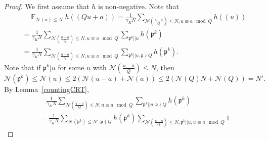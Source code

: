 \documentclass[11pt]{amsart}
\theoremstyle{definition}
\DeclareMathOperator*{\E}{\mathbb{E}}
\newcommand{\NN}{{\mathcal N}}
\newcommand{\mf}{\mathfrak}
\begin{document}
\begin{proof}
We first assume that $h$ is non-negative.
 Note that
\begin{equation}\label{firstTK}
    \begin{split}
        &\quad \E_{\NN(u) \leq N}h((Qu+a))
        =\frac{1}{\gamma_{K} N}\sum_{\NN(\frac{u-a}{Q})\leq N, u\equiv a \mod Q}h((u))
        \\&=\frac{1}{\gamma_{K} N}\sum_{\NN(\frac{u-a}{Q})\leq N, u\equiv a \mod Q}\sum_{\mf p^{k}|| u} h(\mf p^{k})
        \\&=\frac{1}{\gamma_{K} N}\sum_{\NN(\frac{u-a}{Q})\leq N, u\equiv a \mod Q}\sum_{\mf p^{k}|| u, \mf p\nmid Q} h(\mf p^{k}).
    \end{split}
\end{equation}
%
 Note that if $\mf p^{k}\vert u$ for some $u$ with $\NN(\frac{u-a}{Q})\leq N$, then
$$\NN(\mf p^{k})\leq \NN(u)\leq 2(\NN(u-a)+\NN(a))\leq 2(\NN(Q)N+\NN(Q))=N'.$$ 
By Lemma~\ref{countingCRT},
\begin{equation}\label{firstTK2}
    \begin{split}
        &\quad 
        \frac{1}{\gamma_{K} N}\sum_{\NN(\frac{u-a}{Q})\leq N, u\equiv a \mod Q}\sum_{\mf p^{k}|| u, \mf p\nmid Q} h(\mf p^{k})
        \\&=\frac{1}{\gamma_{K} N}\sum_{\NN(\mf p^{k})\leq N', \mf p\nmid Q}h(\mf p^{k})\sum_{\NN(\frac{u-a}{Q})\leq N, \mf p^{k}||u, u\equiv a \mod Q} 1

\end{split}
\end{equation}
\end{proof}
\end{document}
